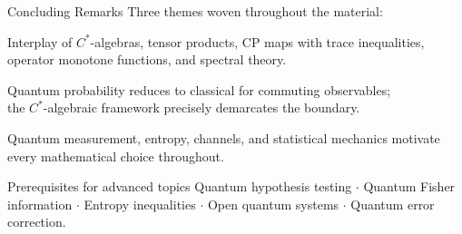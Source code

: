 \documentclass{beamer}
\begin{document}
\begin{frame}[shrink=10]{Concluding Remarks}
  \small
  Three themes woven throughout the material:

  \begin{tcolorbox}[thmbox={Algebraic and Analytic Interplay}, left=3pt, right=3pt, top=2pt, bottom=2pt]
  \justifying
    Interplay of $C^*$-algebras, tensor products, CP maps with trace inequalities,\\ 
    operator monotone functions, and spectral theory.
  \end{tcolorbox}

  \vspace{0.15em}
  \begin{tcolorbox}[thmbox={Classical and Quantum Probability}, left=3pt, right=3pt, top=2pt, bottom=2pt]
  \justifying
    Quantum probability reduces to classical for commuting observables;\\
    the $C^*$-algebraic framework precisely demarcates the boundary.
  \end{tcolorbox}

  \vspace{0.15em}
  \begin{tcolorbox}[thmbox={Mathematics and Physics}, left=3pt, right=3pt, top=2pt, bottom=2pt]
  \justifying
    Quantum measurement, entropy, channels, and statistical mechanics motivate every
    mathematical choice throughout.
  \end{tcolorbox}

  \vspace{0.15em}
  \begin{alertblock}{Prerequisites for advanced topics}
    Quantum hypothesis testing $\cdot$ Quantum Fisher information $\cdot$
    Entropy inequalities $\cdot$ Open quantum systems $\cdot$ Quantum error correction.
  \end{alertblock}
\end{frame}
\end{document}
